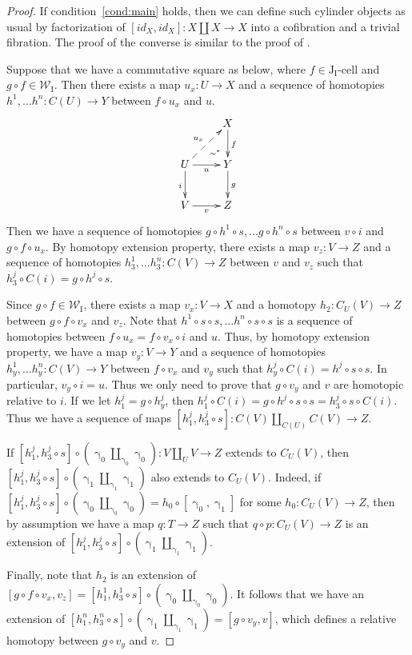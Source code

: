 \documentclass{tac}
\theoremstyle{definition}
\newcommand{\we}{\mathcal{W}}
\newcommand{\I}{\mathrm{I}}
\newcommand{\J}{\mathrm{J}}
\newcommand{\class}[2]{#1\text{-}\mathrm{#2}}
\newcommand{\Icell}[1][\I]{\class{#1}{cell}}
\newcommand{\Jcell}[1][]{\Icell[\J#1]}
\newcommand{\cyli}{\upgamma}
\begin{document}
\begin{proof}
If condition~\eqref{cond:main} holds, then we can define such cylinder objects as usual by factorization of $[id_X,id_X] : X \amalg X \to X$ into a cofibration and a trivial fibration.
The proof of the converse is similar to the proof of .

Suppose that we have a commutative square as below, where $f \in \Jcell[_\I]$ and $g \circ f \in \we_\I$.
Then there exists a map $u_x : U \to X$ and a sequence of homotopies $h^1, \ldots h^n : C(U) \to Y$ between $f \circ u_x$ and $u$.
\[ \xymatrix{   \ar@{}[dr]|(.7){\sim^*}               & X \ar[d]^f \\
              U \ar@{-->}[ur]^{u_x} \ar[d]_i \ar[r]_u & Y \ar[d]^g \\
              V \ar[r]_v                              & Z
            } \]
Then we have a sequence of homotopies $g \circ h^1 \circ s, \ldots g \circ h^n \circ s$ between $v \circ i$ and $g \circ f \circ u_x$.
By homotopy extension property, there exists a map $v_z : V \to Z$ and a sequence of homotopies $h^1_3, \ldots h^n_3 : C(V) \to Z$ between $v$ and $v_z$ such that $h^j_3 \circ C(i) = g \circ h^j \circ s$.

Since $g \circ f \in \we_\I$, there exists a map $v_x : V \to X$ and a homotopy $h_2 : C_U(V) \to Z$ between $g \circ f \circ v_x$ and $v_z$.
Note that $h^1 \circ s \circ s, \ldots h^n \circ s \circ s$ is a sequence of homotopies between $f \circ u_x = f \circ v_x \circ i$ and $u$.
Thus, by homotopy extension property, we have a map $v_y : V \to Y$ and a sequence of homotopies $h^1_y, \ldots h^n_y : C(V) \to Y$ between $f \circ v_x$ and $v_y$ such that $h^j_y \circ C(i) = h^j \circ s \circ s$.
In particular, $v_y \circ i = u$.
Thus we only need to prove that $g \circ v_y$ and $v$ are homotopic relative to $i$.
If we let $h^j_1 = g \circ h^j_y$, then $h^j_1 \circ C(i) = g \circ h^j \circ s \circ s = h^j_3 \circ s \circ C(i)$.
Thus we have a sequence of maps $[h^j_1, h^j_3 \circ s] : C(V) \amalg_{C(U)} C(V) \to Z$.

If $[h^j_1, h^j_3 \circ s] \circ (\cyli_0 \amalg_{\cyli_0} \cyli_0) : V \amalg_U V \to Z$ extends to $C_U(V)$, then $[h^j_1, h^j_3 \circ s] \circ (\cyli_1 \amalg_{\cyli_1} \cyli_1)$ also extends to $C_U(V)$.
Indeed, if $[h^j_1, h^j_3 \circ s] \circ (\cyli_0 \amalg_{\cyli_0} \cyli_0) = h_0 \circ [\cyli_0,\cyli_1]$ for some $h_0 : C_U(V) \to Z$, then by assumption we have a map $q : T \to Z$
such that $q \circ p : C_U(V) \to Z$ is an extension of $[h^j_1, h^j_3 \circ s] \circ (\cyli_1 \amalg_{\cyli_1} \cyli_1)$.

Finally, note that $h_2$ is an extension of $[g \circ f \circ v_x, v_z] = [h^1_1, h^1_3 \circ s] \circ (\cyli_0 \amalg_{\cyli_0} \cyli_0)$.
It follows that we have an extension of $[h^n_1, h^n_3 \circ s] \circ (\cyli_1 \amalg_{\cyli_1} \cyli_1) = [g \circ v_y, v]$,
which defines a relative homotopy between $g \circ v_y$ and $v$.
\end{proof}
\end{document}
